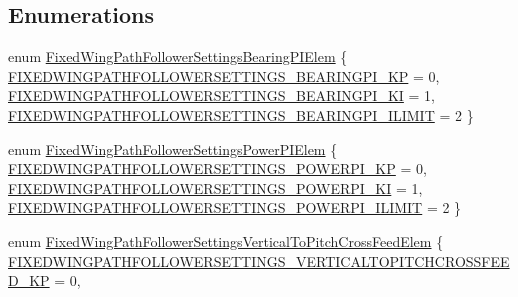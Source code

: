 \subsection*{\-Enumerations}
\begin{DoxyCompactItemize}
\item 
enum \hyperlink{group___fixed_wing_path_follower_settings_ga67a5b5d65314bf02e7b2383dd30360f1}{\-Fixed\-Wing\-Path\-Follower\-Settings\-Bearing\-P\-I\-Elem} \{ \hyperlink{group___fixed_wing_path_follower_settings_gga67a5b5d65314bf02e7b2383dd30360f1aa1c5d7db1040c773aac0d2cd351fa5dd}{\-F\-I\-X\-E\-D\-W\-I\-N\-G\-P\-A\-T\-H\-F\-O\-L\-L\-O\-W\-E\-R\-S\-E\-T\-T\-I\-N\-G\-S\-\_\-\-B\-E\-A\-R\-I\-N\-G\-P\-I\-\_\-\-K\-P} = 0, 
\hyperlink{group___fixed_wing_path_follower_settings_gga67a5b5d65314bf02e7b2383dd30360f1a514ac24f70ba25ea52381dbbd26218c3}{\-F\-I\-X\-E\-D\-W\-I\-N\-G\-P\-A\-T\-H\-F\-O\-L\-L\-O\-W\-E\-R\-S\-E\-T\-T\-I\-N\-G\-S\-\_\-\-B\-E\-A\-R\-I\-N\-G\-P\-I\-\_\-\-K\-I} = 1, 
\hyperlink{group___fixed_wing_path_follower_settings_gga67a5b5d65314bf02e7b2383dd30360f1ae501cb206b5b6d895c722a071b96a5cb}{\-F\-I\-X\-E\-D\-W\-I\-N\-G\-P\-A\-T\-H\-F\-O\-L\-L\-O\-W\-E\-R\-S\-E\-T\-T\-I\-N\-G\-S\-\_\-\-B\-E\-A\-R\-I\-N\-G\-P\-I\-\_\-\-I\-L\-I\-M\-I\-T} = 2
 \}
\item 
enum \hyperlink{group___fixed_wing_path_follower_settings_gafedadf2fafc741176c280d9a44301d6e}{\-Fixed\-Wing\-Path\-Follower\-Settings\-Power\-P\-I\-Elem} \{ \hyperlink{group___fixed_wing_path_follower_settings_ggafedadf2fafc741176c280d9a44301d6ea4df287ae1633f8a80bb9dac6aedb5c6e}{\-F\-I\-X\-E\-D\-W\-I\-N\-G\-P\-A\-T\-H\-F\-O\-L\-L\-O\-W\-E\-R\-S\-E\-T\-T\-I\-N\-G\-S\-\_\-\-P\-O\-W\-E\-R\-P\-I\-\_\-\-K\-P} = 0, 
\hyperlink{group___fixed_wing_path_follower_settings_ggafedadf2fafc741176c280d9a44301d6eafc1c4a8f9157be6801ecad23b4731525}{\-F\-I\-X\-E\-D\-W\-I\-N\-G\-P\-A\-T\-H\-F\-O\-L\-L\-O\-W\-E\-R\-S\-E\-T\-T\-I\-N\-G\-S\-\_\-\-P\-O\-W\-E\-R\-P\-I\-\_\-\-K\-I} = 1, 
\hyperlink{group___fixed_wing_path_follower_settings_ggafedadf2fafc741176c280d9a44301d6ea3f0dea701598c1bcc84f27b577602b57}{\-F\-I\-X\-E\-D\-W\-I\-N\-G\-P\-A\-T\-H\-F\-O\-L\-L\-O\-W\-E\-R\-S\-E\-T\-T\-I\-N\-G\-S\-\_\-\-P\-O\-W\-E\-R\-P\-I\-\_\-\-I\-L\-I\-M\-I\-T} = 2
 \}
\item 
enum \hyperlink{group___fixed_wing_path_follower_settings_gaa67f8b1fcfada832142c7e20a632b84d}{\-Fixed\-Wing\-Path\-Follower\-Settings\-Vertical\-To\-Pitch\-Cross\-Feed\-Elem} \{ \hyperlink{group___fixed_wing_path_follower_settings_ggaa67f8b1fcfada832142c7e20a632b84da38f1c8fc2fbc7b9a2cb02684a6b2ee78}{\-F\-I\-X\-E\-D\-W\-I\-N\-G\-P\-A\-T\-H\-F\-O\-L\-L\-O\-W\-E\-R\-S\-E\-T\-T\-I\-N\-G\-S\-\_\-\-V\-E\-R\-T\-I\-C\-A\-L\-T\-O\-P\-I\-T\-C\-H\-C\-R\-O\-S\-S\-F\-E\-E\-D\-\_\-\-K\-P} = 0, 

\end{DoxyCompactItemize}
